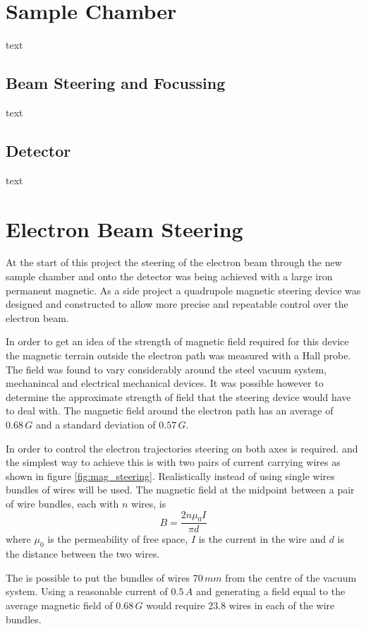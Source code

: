 \section{Sample Chamber}
text
    \subsection{Beam Steering and Focussing}
text

    \subsection{Detector}
text

\section{Electron Beam Steering}
At the start of this project the steering of the electron beam through the new sample chamber and onto the detector was being achieved with a large iron permanent magnetic. As a side project a quadrupole magnetic steering device was designed and constructed to allow more precise and repeatable control over the electron beam.

In order to get an idea of the strength of magnetic field required for this device the magnetic terrain outside the electron path was measured with a Hall probe. The field was found to vary considerably around the steel vacuum system, mechanincal and electrical mechanical devices. It was possible however to determine the approximate strength of field that the steering device would have to deal with. The magnetic field around the electron path has an average of $0.68\,\unit{G}$ and a standard deviation of $0.57\,\unit{G}$.

In order to control the electron trajectories steering on both axes is required. and the simplest way to achieve this is with two pairs of current carrying wires as shown in figure \ref{fig:mag_steering}. Realistically instead of using single wires bundles of wires will be used. The magnetic field at the midpoint between a pair of wire bundles, each with $n$ wires, is
\begin{equation}
B=\frac{2n\mu_0I}{\pi d}
\end{equation}
where $\mu_0$ is the permeability of free space, $I$ is the current in the wire and $d$ is the distance between the two wires.

The is possible to put the bundles of wires $70\,\unit{mm}$ from the centre of the vacuum system. Using a reasonable current of $0.5\,\unit{A}$ and generating a field equal to the average magnetic field of $0.68\,\unit{G}$ would require $23.8$ wires in each of the wire bundles.

